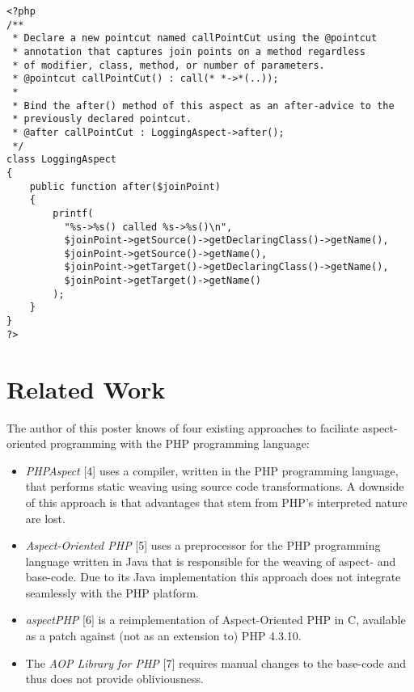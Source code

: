 \documentclass[portrait,a0]{a0poster}
\begin{document}
\begin{poster}
\begin{pcolumn}
\begin{pbox}
\begin{lstlisting}
<?php
/**
 * Declare a new pointcut named callPointCut using the @pointcut
 * annotation that captures join points on a method regardless
 * of modifier, class, method, or number of parameters.
 * @pointcut callPointCut() : call(* *->*(..));
 *
 * Bind the after() method of this aspect as an after-advice to the
 * previously declared pointcut.
 * @after callPointCut : LoggingAspect->after();
 */
class LoggingAspect
{
    public function after($joinPoint)
    {
        printf(
          "%s->%s() called %s->%s()\n",
          $joinPoint->getSource()->getDeclaringClass()->getName(),
          $joinPoint->getSource()->getName(),
          $joinPoint->getTarget()->getDeclaringClass()->getName(),
          $joinPoint->getTarget()->getName()
        );
    }
}
?>
\end{lstlisting}

\section{Related Work}
\large
  The author of this poster knows of four existing approaches to faciliate
  aspect-oriented programming with the PHP programming language:

  \begin{itemize}

    \item

      \emph{PHPAspect} [4] uses a compiler, written in the PHP programming
      language, that performs static weaving using source code transformations.
      A downside of this approach is that advantages that stem from PHP's
      interpreted nature are lost.

    \item

      \emph{Aspect-Oriented PHP} [5] uses a preprocessor for the PHP programming
      language written in Java that is responsible for the weaving of aspect- and
      base-code. Due to its Java implementation this approach does not integrate
      seamlessly with the PHP platform.

    \item

      \emph{aspectPHP} [6] is a reimplementation of Aspect-Oriented PHP in C,
      available as a patch against (not as an extension to) PHP 4.3.10.

    \item

      The \emph{AOP Library for PHP} [7] requires manual changes to the base-code
      and thus does not provide obliviousness.


\end{itemize}
\end{pbox}
\end{pcolumn}
\end{poster}
\end{document}
